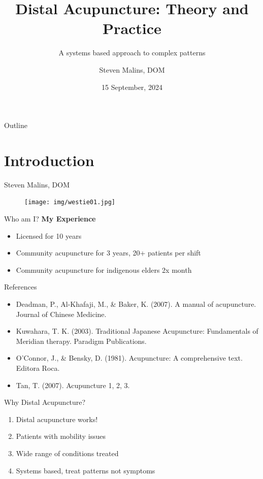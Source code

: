 \documentclass{beamer}
\title[Distal Acupuncture]{Distal Acupuncture: Theory and Practice}
\subtitle{A systems based approach to complex patterns}
\author{Steven Malins, DOM}
\institute{New Mexico Society for Acupuncture and Asian Medicine}
\date{15 September, 2024}
\begin{document}
\begin{frame}
    \titlepage
\end{frame}

\begin{frame}[allowframebreaks]{Outline}
    \tableofcontents[hideallsubsections]
\end{frame}



\section{Introduction}

\begin{frame}{Steven Malins, DOM}
  \begin{figure}
    \centering
    \texttt{[image: img/westie01.jpg]}
  \end{figure}
\end{frame}

\begin{frame}{Who am I?} %
  \textbf{\Large My Experience}
  \begin{itemize} \itemsep1em
  \item Licensed for 10 years
  \item Community acupuncture for 3 years, 20+ patients per shift
  \item Community acupuncture for indigenous elders 2x month
  \end{itemize}
\end{frame}

\begin{frame}{References}
  \begin{itemize} \itemsep1em
  \item Deadman, P., Al-Khafaji, M., \& Baker, K. (2007). A manual of acupuncture. Journal of Chinese Medicine.
  \item Kuwahara, T. K. (2003). Traditional Japanese Acupuncture: Fundamentals of Meridian therapy. Paradigm Publications.
  \item O'Connor, J., \& Bensky, D. (1981). Acupuncture: A comprehensive text. Editora Roca.
  \item Tan, T. (2007). Acupuncture 1, 2, 3.
  \end{itemize}
\end{frame}

\begin{frame}{Why Distal Acupuncture?} %
  \begin{center}
    \pause
    \begin{enumerate}
    \item \LARGE Distal acupuncture works!
      \pause
    \item \LARGE Patients with mobility issues
      \pause
    \item \LARGE Wide range of conditions treated
      \pause
    \item \LARGE Systems based, treat patterns not symptoms
    \end{enumerate}
  \end{center}
\end{frame}
\end{document}
